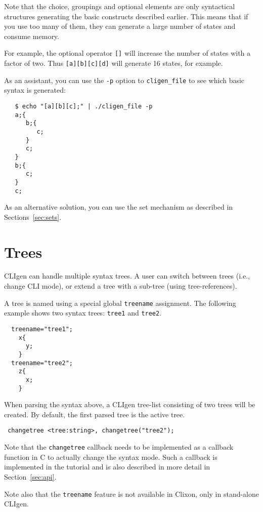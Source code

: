 \documentclass[a4paper, 10pt] {article}
\begin{document}
Note that the choice, groupings and optional elements are only
syntactical structures generating the basic constructs described
earlier. This means that if you use too many of them, they can
generate a large number of states and consume memory.

For example, the optional operator {\tt []} will increase the number of states with a
factor of two. Thus {\tt [a][b][c][d]} will generate 16 states, for
example.

As an assistant, you can use the {\tt -p} option to {\tt cligen\_file} to see which basic syntax is generated:
\begin{verbatim}
   $ echo "[a][b][c];" | ./cligen_file -p
   a;{
      b;{
         c;
      }
      c;
   }
   b;{
      c;
   }
   c;
\end{verbatim}

As an alternative solution, you can use the set mechanism as described in Sections~\ref{sec:sets}.

\section{Trees}
\label{sec:trees}

CLIgen can handle multiple syntax trees. A user can switch between
trees (i.e., change CLI mode), or extend a tree with a sub-tree (using
tree-references).

A tree is named using a special global {\tt treename} assignment. The
following example shows two syntax trees: {\tt tree1} and {\tt tree2}.
\begin{verbatim}
  treename="tree1";
    x{
      y;
    }
  treename="tree2";
    z{
      x;
    }
\end{verbatim}

When parsing the syntax above, a CLIgen tree-list consisting of two
trees will be created. By default, the first parsed tree is the active tree.

\begin{verbatim}
 changetree <tree:string>, changetree("tree2");
\end{verbatim}

Note that the {\tt changetree} callback needs to be implemented as a
callback function in C to actually change the syntax mode. Such a
callback is implemented in the tutorial and is also described in more
detail in Section~\ref{sec:api}.

Note also that the {\tt treename} feature is not available in Clixon, only in stand-alone CLIgen.
\end{document}
